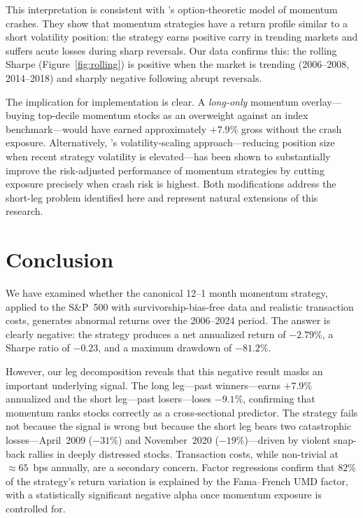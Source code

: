 \documentclass[11pt]{article}
\begin{document}
This interpretation is consistent with \citet{Daniel2016}'s option-theoretic model of
momentum crashes. They show that momentum strategies have a return profile similar to
a short volatility position: the strategy earns positive carry in trending markets and
suffers acute losses during sharp reversals. Our data confirms this: the rolling Sharpe
(Figure~\ref{fig:rolling}) is positive when the market is trending (2006--2008,
2014--2018) and sharply negative following abrupt reversals.

The implication for implementation is clear. A \emph{long-only} momentum overlay---buying
top-decile momentum stocks as an overweight against an index benchmark---would have earned
approximately $+7.9\%$ gross without the crash exposure. Alternatively,
\citet{Barroso2015}'s volatility-scaling approach---reducing position size when recent
strategy volatility is elevated---has been shown to substantially improve the
risk-adjusted performance of momentum strategies by cutting exposure precisely when
crash risk is highest. Both modifications address the short-leg problem identified here
and represent natural extensions of this research.

\section{Conclusion}
\label{sec:conclusion}

We have examined whether the canonical 12--1 month momentum strategy, applied to the
S\&P~500 with survivorship-bias-free data and realistic transaction costs, generates
abnormal returns over the 2006--2024 period. The answer is clearly negative: the
strategy produces a net annualized return of $-2.79\%$, a Sharpe ratio of $-0.23$, and
a maximum drawdown of $-81.2\%$.

However, our leg decomposition reveals that this negative result masks an important
underlying signal. The long leg---past winners---earns $+7.9\%$ annualized and the
short leg---past losers---loses $-9.1\%$, confirming that momentum ranks stocks
correctly as a cross-sectional predictor. The strategy fails not because the signal
is wrong but because the short leg bears two catastrophic losses---April~2009
($-31\%$) and November~2020 ($-19\%$)---driven by violent snap-back rallies in deeply
distressed stocks. Transaction costs, while non-trivial at $\approx65$~bps annually,
are a secondary concern. Factor regressions confirm that $82\%$ of the strategy's
return variation is explained by the Fama--French UMD factor, with a statistically
significant negative alpha once momentum exposure is controlled for.
\end{document}
